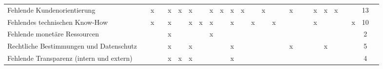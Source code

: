 \begin{sidewaystable}[ht]
\begin{tabular}{|p{6cm}|c|c|c|c|c|c|c|c|c|c|c|c|c|c|c|c|c|c|c|c|c|c|c|c|c|}
		Fehlende Kundenorientierung                     &                   & x                  &                    & x                    & x                  & x                 &                   & x                    & x                  & x                    & x                &                  & x                   &                  &                 & x                    &                    &                 & x                & x                & x                      &                      &                        & 13 \\
		Fehlendes technischen Know-How                  &                   & x                  &                    & x                    &                    & x                 & x                 & x                    &                    & x                    &                  & x                &                     & x                &                 &                      &                    &                 & x                &                  &                        &                      & x                      & 10 \\
		Fehlende monetäre Ressourcen                    &                   &                    &                    & x                    &                    &                   &                   & x                    &                    &                      &                  &                  &                     &                  &                 &                      &                    &                 &                  &                  &                        &                      &                        & 2  \\
		Rechtliche Bestimmungen und Datenschutz         &                   &                    &                    & x                    &                    & x                 &                   &                      &                    & x                    &                  &                  &                     &                  &                 & x                    &                    &                 &                  & x                &                        &                      &                        & 5  \\
		Fehlende Transparenz (intern und extern)        &                   &                    &                    & x                    & x                  & x                 &                   &                      &                    & x                    &                  &                  &                     &                  &                 &                      &                    &                 &                  &                  &                        &                      &                        & 4  \\

\end{tabular}
\end{sidewaystable}
